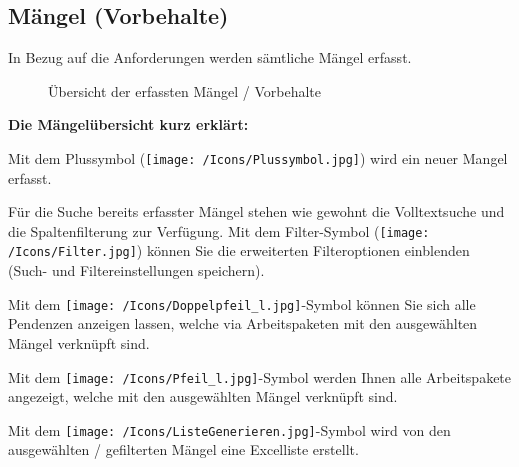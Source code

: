 


\subsection{Mängel (Vorbehalte)}

In Bezug auf die Anforderungen werden sämtliche Mängel erfasst. 

\begin{figure}[H]
\caption{Übersicht der erfassten Mängel / Vorbehalte}
\end{figure}

\textbf{Die Mängelübersicht kurz erklärt:}

\vspace{\baselineskip}

\begin{compactitem}
	\item Mit dem Plussymbol (\texttt{[image: /Icons/Plussymbol.jpg]}) wird ein neuer Mangel erfasst. 
	\item Für die Suche bereits erfasster Mängel stehen wie gewohnt die Volltextsuche und die Spaltenfilterung zur Verfügung. Mit dem Filter-Symbol (\texttt{[image: /Icons/Filter.jpg]}) können Sie die erweiterten Filteroptionen einblenden (Such- und Filtereinstellungen speichern).
	\item Mit dem \texttt{[image: /Icons/Doppelpfeil\_l.jpg]}-Symbol können Sie sich alle Pendenzen anzeigen lassen, welche via Arbeitspaketen mit den ausgewählten Mängel verknüpft sind.
	\item Mit dem \texttt{[image: /Icons/Pfeil\_l.jpg]}-Symbol werden Ihnen alle Arbeitspakete angezeigt, welche mit den ausgewählten Mängel verknüpft sind.
	\item Mit dem \texttt{[image: /Icons/ListeGenerieren.jpg]}-Symbol wird von den ausgewählten / gefilterten Mängel eine Excelliste erstellt.
\end{compactitem}

